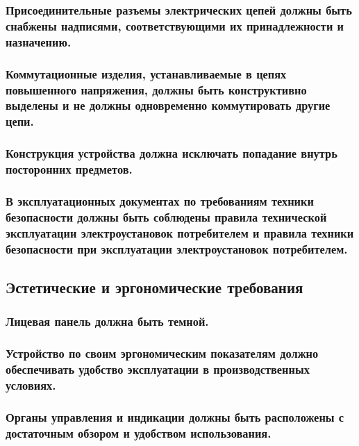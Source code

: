 \documentclass[a4paper]{bsuir-tor}
\begin{document}
\subsubsection{Присоединительные разъемы электрических цепей
  должны быть снабжены надписями,
  соответствующими их принадлежности и назначению.}

\subsubsection{Коммутационные изделия,
  устанавливаемые в цепях повышенного напряжения,
  должны быть конструктивно выделены
  и не должны одновременно коммутировать другие цепи.}

\subsubsection{Конструкция устройства должна исключать попадание
  внутрь посторонних предметов.}

\subsubsection{В эксплуатационных документах по требованиям
  техники безопасности должны быть соблюдены правила технической
  эксплуатации электроустановок потребителем и правила техники
  безопасности при эксплуатации электроустановок потребителем.}

\subsection{Эстетические и эргономические требования}

\subsubsection{Лицевая панель должна быть темной.}

\subsubsection{Устройство по своим эргономическим показателям
  должно обеспечивать удобство эксплуатации в производственных условиях.}

\subsubsection{Органы управления и индикации должны быть
  расположены с достаточным обзором и удобством использования.}
\end{document}
